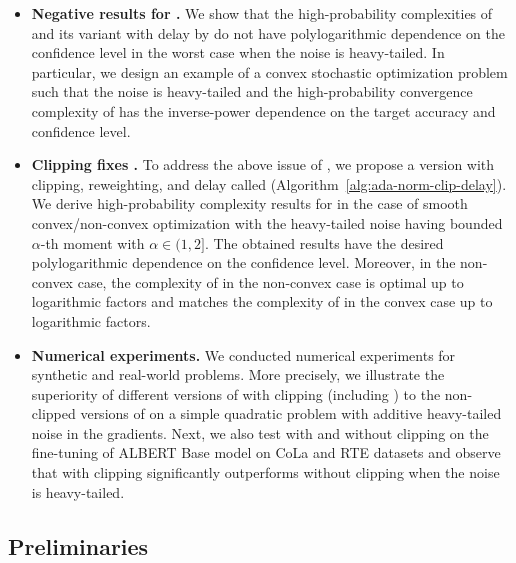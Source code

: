 \documentclass{article}
\begin{document}
\begin{itemize}
    \item \textbf{Negative results for .} We show that the high-probability complexities of  and its variant with delay by \citet{li2020high} do not have polylogarithmic dependence on the confidence level in the worst case when the noise is heavy-tailed. In particular, we design an example of a convex stochastic optimization problem such that the noise is heavy-tailed and the high-probability convergence complexity of  has the inverse-power dependence on the target accuracy and confidence level.

    \item \textbf{Clipping fixes .} To address the above issue of , we propose a version with clipping, reweighting, and delay called  (Algorithm~\ref{alg:ada-norm-clip-delay}). We derive high-probability complexity results for  in the case of smooth convex/non-convex optimization with the heavy-tailed noise having bounded $\alpha$-th moment with $\alpha \in (1,2]$. The obtained results have the desired polylogarithmic dependence on the confidence level. Moreover, in the non-convex case, the complexity of  in the non-convex case is optimal up to logarithmic factors and matches the complexity of  in the convex case up to logarithmic factors.

    \item \textbf{Numerical experiments.} We conducted numerical experiments for synthetic and real-world problems. More precisely, we illustrate the superiority of different versions of  with clipping (including ) to the non-clipped versions of  on a simple quadratic problem with additive heavy-tailed noise in the gradients. Next, we also test  with and without clipping on the fine-tuning of ALBERT Base model \citep{lan2019albert} on CoLa and RTE datasets \citep{wang2018glue} and observe that  with clipping significantly outperforms  without clipping when the noise is heavy-tailed.
\end{itemize}


\subsection{Preliminaries}\label{section:preliminaries}
\end{document}
